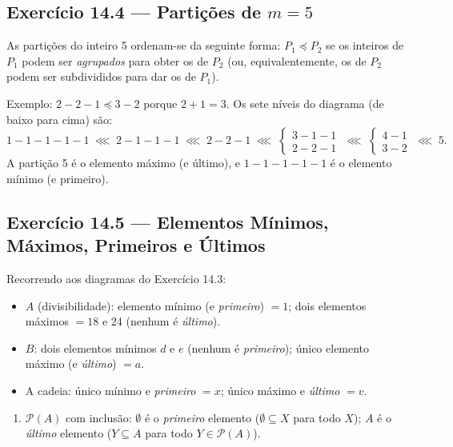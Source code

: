 \documentclass[12pt,a4paper]{article}
\begin{document}
\subsection*{Exercício 14.4 — Partições de $m = 5$}

As partições do inteiro 5 ordenam-se da seguinte forma: $P_1 \preceq P_2$ se os inteiros
de $P_1$ podem ser \emph{agrupados} para obter os de $P_2$ (ou, equivalentemente,
os de $P_2$ podem ser subdivididos para dar os de $P_1$).

Exemplo: $2{-}2{-}1 \preceq 3{-}2$ porque $2 + 1 = 3$. Os sete níveis do diagrama
(de baixo para cima) são:
\[
  1{-}1{-}1{-}1{-}1 \;\lll\; 2{-}1{-}1{-}1 \;\lll\; 2{-}2{-}1 \;\lll\;
  \begin{cases} 3{-}1{-}1 \\ 2{-}2{-}1 \end{cases} \;\lll\;
  \begin{cases} 4{-}1 \\ 3{-}2 \end{cases} \;\lll\; 5.
\]
A partição 5 é o elemento máximo (e último), e $1{-}1{-}1{-}1{-}1$ é o elemento mínimo
(e primeiro).

\subsection*{Exercício 14.5 — Elementos Mínimos, Máximos, Primeiros e Últimos}

Recorrendo aos diagramas do Exercício 14.3:

\begin{itemize}
  \item[(a.i)] $A$ (divisibilidade): elemento mínimo (e \emph{primeiro}) $= 1$;
        dois elementos máximos $= 18$ e $24$ (nenhum é \emph{último}).
  \item[(a.ii)] $B$: dois elementos mínimos $d$ e $e$ (nenhum é \emph{primeiro});
        único elemento máximo (e \emph{último}) $= a$.
  \item[(a.iii)] A cadeia: único mínimo e \emph{primeiro} $= x$;
        único máximo e \emph{último} $= v$.
\end{itemize}

\begin{enumerate}[label=(\alph*),start=2]
  \item $\mathcal{P}(A)$ com inclusão: $\emptyset$ é o \emph{primeiro} elemento
        ($\emptyset \subseteq X$ para todo $X$); $A$ é o \emph{último} elemento
        ($Y \subseteq A$ para todo $Y \in \mathcal{P}(A)$).
\end{enumerate}
\end{document}

